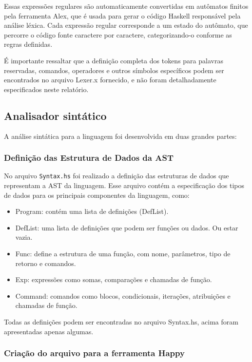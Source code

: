 \documentclass{article}
\begin{document}
Essas expressões regulares são automaticamente convertidas em autômatos finitos pela ferramenta Alex, que é usada para gerar o código Haskell responsável pela análise léxica. Cada expressão regular corresponde a um estado do autômato, que percorre o código fonte caractere por caractere, categorizando-o conforme as regras definidas.

É importante ressaltar que a definição completa dos tokens para palavras reservadas, comandos, operadores e outros símbolos específicos podem ser encontrados no arquivo Lexer.x fornecido, e não foram detalhadamente especificados neste relatório.


\subsection{Analisador sintático}\label{desenvolvimento:parser}
A análise sintática para a linguagem foi desenvolvida em duas grandes partes:

\subsubsection{Definição das Estrutura de Dados da AST}
No arquivo \texttt{Syntax.hs} foi realizado a definição das estruturas de dados que representam a AST da linguagem. Esse arquivo contém a especificação dos tipos de dados para os principais componentes da linguagem, como:

\begin{itemize}
    \item Program: contém uma lista de definições (DefList).
    \item DefList: uma lista de definições que podem ser funções ou dados. Ou estar vazia.
    \item Func: define a estrutura de uma função, com nome, parâmetros, tipo de retorno e comandos.
    \item Exp: expressões como somas, comparações e chamadas de função.
    \item Command: comandos como blocos, condicionais, iterações, atribuições e chamadas de função.
\end{itemize}

Todas as definições podem ser encontradas no arquivo Syntax.hs, acima foram apresentadas apenas algumas.

\subsubsection{Criação do arquivo para a ferramenta Happy}
\end{document}
